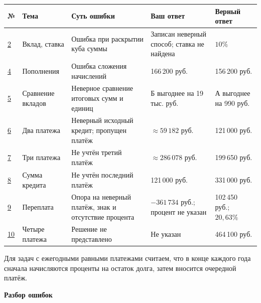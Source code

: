 \documentclass[a4paper,11pt]{article}
\begin{document}
\renewcommand{\arraystretch}{1.3}
\small
\begin{tabularx}{\linewidth}{@{}p{11mm}p{23mm}X p{24mm}p{28mm}@{}}
\toprule
\textbf{№} & \textbf{Тема} & \textbf{Суть ошибки} & \textbf{Ваш ответ} & \textbf{Верный ответ}\\\midrule
\hyperref[task:2]{2} & Вклад, ставка & Ошибка при раскрытии куба суммы & Записан неверный способ; ставка не найдена & $10\%$\\
\hyperref[task:4]{4} & Пополнения & Ошибка сложения начислений & 166\,200 руб. & 156\,200 руб.\\
\hyperref[task:5]{5} & Сравнение вкладов & Неверное сравнение итоговых сумм и единиц & Б выгоднее на 19 тыс. руб. & А выгоднее на 990 руб.\\
\hyperref[task:6]{6} & Два платежа & Неверный исходный кредит; пропущен платёж & $\approx59\,182$ руб. & 121\,000 руб.\\
\hyperref[task:7]{7} & Три платежа & Не учтён третий платёж & $\approx286\,078$ руб. & 199\,650 руб.\\
\hyperref[task:8]{8} & Сумма кредита & Не учтён последний платёж & 121\,000 руб. & 331\,000 руб.\\
\hyperref[task:9]{9} & Переплата & Опора на неверный платёж, знак и отсутствие процента & $-361\,734$ руб.; процент не указан & 102\,450 руб.; $20{,}63\%$\\
\hyperref[task:10]{10} & Четыре платежа & Решение не представлено & Не указан & 464\,100 руб.\\
\bottomrule
\end{tabularx}
\normalsize
\vfill
\textcolor{muted}{\footnotesize Для задач с ежегодными равными платежами считаем, что в конце каждого года сначала начисляются проценты на остаток долга, затем вносится очередной платёж.}
\clearpage
\thispagestyle{empty}
\vspace*{.37\textheight}
\begin{center}{\Huge\bfseries\color{accent} Разбор ошибок}\end{center}
\end{document}
